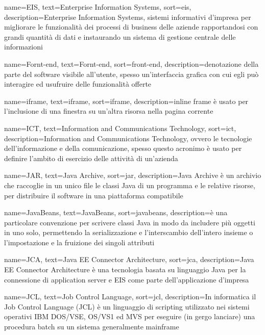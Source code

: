 {
    name=EIS,
    text=Enterprise Information Systems,
    sort=eis,
    description={Enterprise Information Systems, sistemi informativi d'impresa per migliorare le funzionalità dei processi di business delle aziende rapportandosi con grandi quantità di dati e instaurando un sistema di gestione centrale delle informazioni}
}

{
    name=Fornt-end,
    text=Fornt-end,
    sort=front-end,
    description={denotazione della parte del software visibile all'utente, spesso un'interfaccia grafica con cui egli può interagire ed usufruire delle funzionalità offerte}
}


{
    name=iframe,
    text=iframe,
    sort=iframe,
    description={inline frame è usato per l'inclusione di una finestra su un'altra risorsa nella pagina corrente}
}

{
    name=ICT,
    text=Information and Communications Technology,
    sort=ict,
    description={Information and Communications Technology, ovvero le tecnologie dell’informazione e della comunicazione, 
spesso questo acronimo è usato per definire l'ambito di esercizio delle attività di un'azienda}
}

{
    name=JAR,
    text=Java Archive,
    sort=jar,
    description={Java Archive è un archivio che raccoglie in un unico file le classi Java di un programma e le relative risorse, per distribuire il software in una piattaforma compatibile}
}

{
    name=JavaBeans,
    text=JavaBeans,
    sort=javabeans,
    description={è una particolare convenzione per scrivere classi Java in modo da includere più oggetti in uno solo, permettendo la serializzazione e l'interscambio dell'intero insieme o l'impostazione e la fruizione dei singoli attributi}
}

{
    name=JCA,
    text=Java EE Connector Architecture,
    sort=jca,
    description={Java EE Connector Architecture è una tecnologia basata su linguaggio Java per la connessione di application server e EIS come parte dell'applicazione d'impresa}
}

{
    name=JCL,
    text=Job Control Language,
    sort=jcl,
    description={In informatica il Job Control Language (JCL) è un linguaggio di scripting utilizzato nei sistemi operativi IBM DOS/VSE, OS/VS1 ed MVS per eseguire (in gergo lanciare) una procedura batch su un sistema generalmente mainframe}
}

